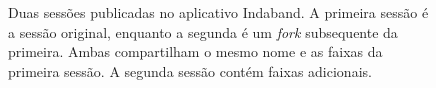 \begin{figure}[h]
  \begin{center}
    \caption{Duas sessões publicadas no aplicativo Indaband. A primeira sessão é
    a sessão original, enquanto a segunda é um \textit{fork} subsequente da
    primeira. Ambas compartilham o mesmo nome e as faixas da primeira sessão. A
    segunda sessão contém faixas adicionais.}
    \label{fig:session_and_fork}
  \end{center}
  \end{figure}

